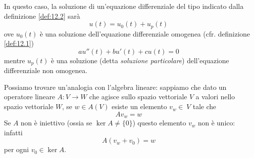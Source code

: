 In questo caso, la soluzione di un'equazione differenziale del tipo indicato dalla definizione \ref{def:12.2} sarà 
\[
u(t) = u_0(t) + u_p(t)
\]
ove $u_0(t)$ è una soluzione dell'equazione differenziale omogenea (cfr. definizione \ref{def:12.1})
\[
au''(t)+bu'(t)+cu(t) = 0
\]
mentre $u_p(t)$ è una soluzione (detta \emph{soluzione particolare}) dell'equazione differenziale non omogenea.
\begin{remark}
    Possiamo trovare un'analogia con l'algebra lineare: sappiamo che dato un operatore lineare $A\colon V \to W$ che agisce sullo spazio vettoriale $V$ a valori nello spazio vettoriale $W$, se $w\in A(V)$ esiste un elemento $v_w\in\ V$ tale che
    \[
    A v_w = w
    \]
    Se $A$ non è iniettivo (ossia se $\ker A \ne \{0\}$) questo elemento $v_w$ non è unico: infatti
    \[
    A(v_w + v_0) = w 
    \]
    per ogni $v_0\in\ker A$.
\end{remark}
